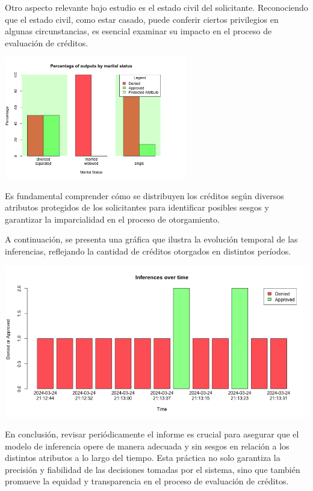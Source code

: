 \documentclass{article}
\begin{document}
\begin{multicols}{2}
Otro aspecto relevante bajo estudio es el estado civil del solicitante. Reconociendo que el estado civil, como estar casado, puede conferir ciertos privilegios en algunas circunstancias, es esencial examinar su impacto en el proceso de evaluación de créditos. 

\begin{center} %
    \includegraphics[width=8cm]{tex/media/marital.png} 
\end{center}

Es fundamental comprender cómo se distribuyen los créditos según diversos atributos protegidos de los solicitantes para identificar posibles sesgos y garantizar la imparcialidad en el proceso de otorgamiento.

\end{multicols}

A continuación, se presenta una gráfica que ilustra la evolución temporal de las inferencias, reflejando la cantidad de créditos otorgados en distintos períodos.

\begin{center} %
    \includegraphics[width=16cm]{tex/media/sequence.png} 
\end{center}

En conclusión, revisar periódicamente el informe es crucial para asegurar que el modelo de inferencia opere de manera adecuada y sin sesgos en relación a los distintos atributos a lo largo del tiempo. Esta práctica no solo garantiza la precisión y fiabilidad de las decisiones tomadas por el sistema, sino que también promueve la equidad y transparencia en el proceso de evaluación de créditos.
\end{document}
